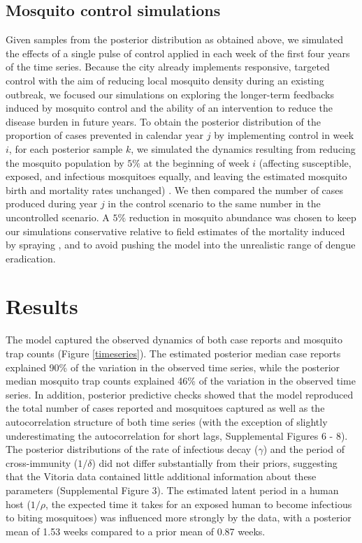 \documentclass[10pt,letterpaper]{article}
\begin{document}
\subsection*{Mosquito control simulations}

Given samples from the posterior distribution as obtained above, we simulated the effects of a single pulse of control applied in each week of the first four years of the time series.
Because the city already implements responsive, targeted control with the aim of reducing local mosquito density during an existing outbreak, we focused our simulations on exploring the longer-term feedbacks induced by mosquito control and the ability of an intervention to reduce the disease burden in future years.
To obtain the posterior distribution of the proportion of cases prevented in calendar year $j$ by implementing control in week $i$, for each posterior sample $k$, we simulated the dynamics resulting from reducing the mosquito population by $5\%$ at the beginning of week $i$ (affecting susceptible, exposed, and infectious mosquitoes equally, and leaving the estimated mosquito birth and mortality rates unchanged) .
We then compared the number of cases produced during year $j$ in the control scenario to the same number in the uncontrolled scenario.
A $5\%$ reduction in mosquito abundance was chosen to keep our simulations conservative relative to field estimates of the mortality induced by spraying \cite{Esu2010}, and to avoid pushing the model into the unrealistic range of dengue eradication.

\section*{Results}

The model captured the observed dynamics of both case reports and mosquito trap counts (Figure \ref{timeseries}).
The estimated posterior median case reports explained 90\% of the variation in the observed time series, while the posterior median mosquito trap counts explained 46\% of the variation in the observed time series. 
In addition, posterior predictive checks showed that the model reproduced the total number of cases reported and mosquitoes captured as well as the autocorrelation structure of both time series (with the exception of slightly underestimating the autocorrelation for short lags, Supplemental Figures 6 - 8).
The posterior distributions of the rate of infectious decay ($\gamma$) and the period of cross-immunity ($1/\delta$) did not differ substantially from their priors, suggesting that the Vitoria data contained little additional information about these parameters (Supplemental Figure 3).
The estimated latent period in a human host ($1/\rho$, the expected time it takes for an exposed human to become infectious to biting mosquitoes) was influenced more strongly by the data, with a posterior mean of 1.53 weeks compared to a prior mean of 0.87 weeks.
\end{document}
